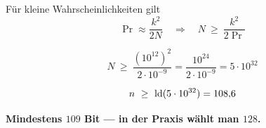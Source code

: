 \begin{aufgabe}
Für kleine Wahrscheinlichkeiten gilt
\[ \Pr \approx \frac{k^{2}}{2N} \quad\Longrightarrow\quad N \ \ge\ \frac{k^{2}}{2\Pr} \]

\[ N \ \ge\ \frac{(10^{12})^{2}}{2\cdot10^{-9}} = \frac{10^{24}}{2\cdot10^{-9}} = 5\cdot10^{32} \]

\[ n \ \ge\ \operatorname{ld}(5\cdot10^{32}) = 108{,}6 \]

\begin{center}
\begin{minipage}{0.9\textwidth}
\textbf{Mindestens $109$ Bit --- in der Praxis wählt man $128$.}
\end{minipage}
\end{center}

\begin{center}
\begin{minipage}{0.88\textwidth}
\end{minipage}
\end{center}
\end{aufgabe}

